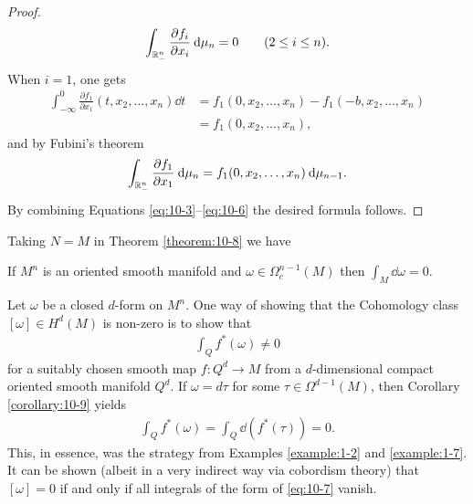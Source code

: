 \begin{proof}
\begin{align}
    \int_{\RR^n_-}\frac{\partial f_i}{\partial x_i}\dd\mu_n = 0\qquad (2\le i\le n).
  \end{align}
  When $i=1$, one gets 
  \begin{align*}
    \int_{-\infty}^0 \frac{\partial f_1}{\partial x_1}(t, x_2, \ldots, x_n)\dd t
    & = f_1(0, x_2, \ldots, x_n) - f_1(-b, x_2, \ldots, x_n)\\
    & = f_1(0, x_2, \ldots, x_n),
  \end{align*}
  and by Fubini's theorem 
  \begin{align}\label{eq:10-6}
    \int_{\RR^n_-} \frac{\partial f_1}{\partial x_1}\dd\mu_n
      = f_1(0, x_2, \ldots, x_n)\dd\mu_{n-1}.
  \end{align}
  By combining Equations \eqref{eq:10-3}--\eqref{eq:10-6} the desired formula follows.
\end{proof}

Taking $N = M$ in Theorem \ref{theorem:10-8} we have
\begin{corollary}\label{corollary:10-9}
  If $M^n$ is an oriented smooth manifold and $\omega\in\Omega^{n-1}_c(M)$ then 
  $\int_M\dd\omega=0$.
\end{corollary}

\begin{remark}\label{remark:10-10}
  Let $\omega$ be a closed $d$-form on $M^n$. One way of showing that the Cohomology class $[\omega]\in H^d(M)$
  is non-zero is to show that 
  \begin{align}\label{eq:10-7}
    \int_Q f^*(\omega) \neq 0
  \end{align}
  for a suitably chosen smooth map $f:Q^d\to M$ from a $d$-dimensional compact
  oriented smooth manifold $Q^d$. If $\omega=d\tau$ for some $\tau\in\Omega^{d-1}(M)$, then 
  Corollary \ref{corollary:10-9} yields
  \begin{align*}
    \int_Q f^*(\omega) = \int_Q \dd(f^*(\tau)) = 0.
  \end{align*}
  This, in essence, was the strategy from Examples \ref{example:1-2} and \ref{example:1-7}. It can 
  be shown (albeit in a very indirect way via cobordism theory) that $[\omega]=0$ if and only if
  all integrals of the form of \ref{eq:10-7} vanish.
\end{remark}


